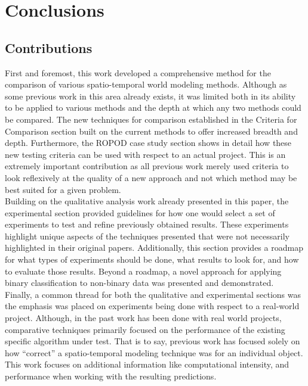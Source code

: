

    \chapter{Conclusions}

    \section{Contributions}

    First and foremost, this work developed a comprehensive method for the
    comparison of various spatio-temporal world modeling methods. Although as
    some previous work in this area
    already exists, it was limited both in its ability to be applied to various
    methods and the depth at which any two methods could be compared. The
    new techniques for comparison established in the Criteria for Comparison
    section built on the current methods to offer increased breadth and depth.
    Furthermore, the ROPOD case study section shows in detail how these new testing criteria
    can be used with respect to an actual project. This is an extremely important
    contribution as all previous work merely used criteria to look reflexively
    at the quality of a new approach and not which method may be
    best suited for a given problem. \\

    Building on the qualitative analysis work already presented in this
    paper, the experimental section provided guidelines for how one would select
    a set of experiments to test and refine previously obtained results.
    These experiments highlight unique aspects of the techniques presented that
    were not necessarily highlighted in their original papers.
    Additionally, this section provides a roadmap for what types of experiments
    should be done, what results to look for, and how to evaluate those results.
    Beyond a roadmap, a novel approach for applying binary classification to
    non-binary data was presented and demonstrated. \\

    Finally, a common thread for both the qualitative and experimental
    sections was the emphasis was placed on experiments being done with respect to a
    real-world project. Although, in the past work has been done with real
    world projects, comparative techniques primarily focused on
    the performance of the existing specific algorithm under test. That is to say, previous work has
    focused solely on how ``correct'' a spatio-temporal modeling technique was
    for an individual object. This work focuses on additional information like
    computational intensity, and performance when working with the
    resulting predictions. \\

